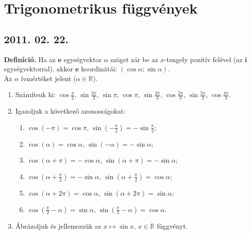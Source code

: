 \documentclass{article}
\newenvironment{abc}{\begin{enumerate}[label=\textit{\alph*})]}{\end{enumerate}}
\begin{document}
\section*{Trigonometrikus függvények}

\subsection*{2011. 02. 22.}
\textbf{Definíció.} Ha az $\mathbf{e}$ egységvektor $\alpha$ szöget zár be az $x$-tengely pozitív felével (az $\mathbf{i}$ egységvektorral), akkor $\mathbf{e}$ koordinátái: $(\cos\alpha;\sin\alpha)$.\\
Az $\alpha$ ívmértéket jelent ($\alpha\in\mathbb R$).

\begin{enumerate}
\item Számítsuk ki: $\cos\frac{\pi}{2}$, $\sin\frac{3\pi}{2}$, $\sin\pi$, $\cos\pi$, $\sin\frac{2\pi}{3}$, $\cos\frac{2\pi}{3}$, $\sin\frac{5\pi}{3}$, $\cos\frac{4\pi}{3}$.
\item Igazoljuk a következő azonosságokat:
\begin{abc}
\item $\cos(-\pi)=\cos \pi$, $\sin\left(-\frac{\pi}{2}\right)=-\sin\frac{\pi}{2}$;
\item $\cos(\alpha)=\cos\alpha$, $\sin(-\alpha)=-\sin\alpha$;
\item $\cos(\alpha+\pi)=-\cos\alpha$, $\sin(\alpha+\pi)=-\sin\alpha$;
\item $\cos\left(\alpha+\frac{\pi}{2}\right)=-\sin\alpha$, $\sin\left(\alpha+\frac{\pi}{2}\right)=\cos\alpha$;
\item $\cos(\alpha+2\pi)=\cos\alpha$, $\sin(\alpha+2\pi)=\sin\alpha$;
\item $\cos\left(\frac{\pi}{2}-\alpha\right)=\sin\alpha$, $\sin\left(\frac{\pi}{2}-\alpha\right)=\cos\alpha$.
\end{abc}
\item Ábrázoljuk és jellemezzük az $x\mapsto \sin x$, $x\in \mathbb R$ függvényt.
\end{enumerate}
\end{document}
